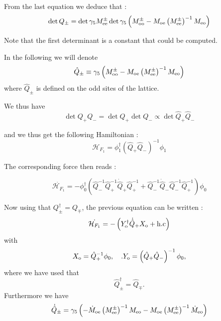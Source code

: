 \documentclass{article}[12pt]
\begin{document}
From the last equation we deduce that :
\begin{equation}
\det{Q_{\pm}} = \det{\gamma_5 M^{\pm}_{\rm{ee}} } \det{\gamma_5
  \left(M^{\pm}_{\rm{oo}} - M_{\rm{oe}}
    \left(M^{\pm}_{\rm{ee}}\right)^{-1} M_{\rm{eo}} \right)}
\end{equation}

Note that the first determinant is a constant that could be computed.

In the following we will denote 
\begin{equation}
\hat{Q}_{\pm} \equiv \gamma_5
  \left(M^{\pm}_{\rm{oo}} - M_{\rm{oe}}
    \left(M^{\pm}_{\rm{ee}}\right)^{-1} M_{\rm{eo}} \right)
\end{equation}
where $\hat{Q}_{\pm}$ is defined on the odd sites of the lattice. 


We thus have 
\begin{equation}
\det{Q_+ Q_-} = \det{Q_+}\det{Q_{-}}\propto\det{\hat{Q}_+ \hat{Q}_-} 
\end{equation}

and we thus get the following Hamiltonian :
\begin{equation}
\mathcal{H}_{F_1} = \phi_1^{\dagger} \left(\hat{Q}_+
    \hat{Q}_-\right)^{-1} \phi_1
\end{equation} 

The corresponding force then reads :

\begin{equation}
\dot{\mathcal{H}_{F_1}} = - \phi_{0}^\dagger\left(    \hat{Q}_-^{-1}
  \hat{Q}_+^{-1}  \dot{\hat{Q}}_+  \hat{Q}_+^{-1}  + \hat{Q}_{-}^{-1}
  \dot{\hat{Q}}_{-}  \hat{Q}_-^{-1}   \hat{Q}_+^{-1}    \right)    \phi_0
\end{equation}

Now using that   $Q_{\pm} ^{\dagger} = Q_{\mp}$, the previous equation
can be written :
\begin{equation}
\dot{\mathcal{H}_{F_1}} = - \left(Y_{\rm{o}}^{\dagger} \dot{\hat{Q}}_{+} X_{\rm{o}}  + \rm{h.c}\right)
\end{equation}
with 
\begin{equation}
  X_{\rm{o}}=\hat{Q}_+^{-1}\phi_0,\quad. Y_{\rm{o}}= \left(\hat{Q}_+
    \hat{Q}_-\right)^{-1} \phi_0,
\end{equation}
where we have used that 
\begin{equation}
  \hat{Q}_\pm^{\dagger} = \hat{Q}_\mp.
\end{equation}
Furthermore we have 
\begin{equation}
\dot{\hat{Q}}_{\pm} =  \gamma_5 \left( -  \dot{M}_{\rm{oe}}
  \left(M^{\pm}_{\rm{ee}}\right)^{-1} M_{\rm{eo}} -  M_{\rm{oe}}
    \left(M^{\pm}_{\rm{ee}}\right)^{-1} \dot{M}_{\rm{eo}}\right)
\end{equation}
\end{document}
